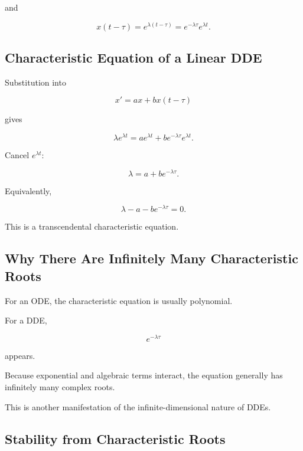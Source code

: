 and

\[
x(t-\tau)
=
e^{\lambda(t-\tau)}
=
e^{-\lambda\tau}e^{\lambda t}.
\]

\subsection{Characteristic Equation of a Linear DDE}
\label{subsec:dde-characteristic-equation}

Substitution into

\[
x'
=
ax+bx(t-\tau)
\]

gives

\[
\lambda e^{\lambda t}
=
ae^{\lambda t}
+
be^{-\lambda\tau}e^{\lambda t}.
\]

Cancel \(e^{\lambda t}\):

\[
\boxed{
\lambda
=
a
+
be^{-\lambda\tau}.
}
\]

Equivalently,

\[
\boxed{
\lambda-a-be^{-\lambda\tau}=0.
}
\]

This is a transcendental characteristic equation.

\subsection{Why There Are Infinitely Many Characteristic Roots}
\label{subsec:dde-infinitely-many-roots}

For an ODE, the characteristic equation is usually polynomial.

For a DDE,

\[
e^{-\lambda\tau}
\]

appears.

Because exponential and algebraic terms interact, the equation generally
has infinitely many complex roots.

This is another manifestation of the infinite-dimensional nature of DDEs.

\subsection{Stability from Characteristic Roots}
\label{subsec:dde-characteristic-stability}

